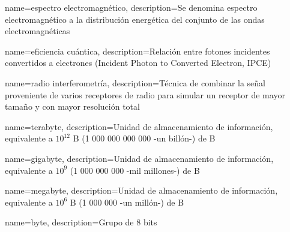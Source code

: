 
{
name={espectro electromagnético},
description={Se denomina espectro electromagnético a la distribución energética del conjunto de las ondas electromagnéticas}
}

{
name={eficiencia cuántica},
description={Relación entre fotones incidentes convertidos a electrones (Incident Photon to Converted Electron, IPCE)}
}

{
name={radio interferometría},
description={Técnica de combinar la señal proveniente de varios receptores de radio para simular un receptor de mayor tamaño y con mayor resolución total}
}

{
name={terabyte},
description={Unidad de almacenamiento de información, equivalente a $10^{12}$ \gls{B} (1 000 000 000 000 -un billón-) de \gls{B}}
}

{
name={gigabyte},
description={Unidad de almacenamiento de información, equivalente a $10^9$ (1 000 000 000 -mil millones-) de \gls{B}}
}

{
name={megabyte},
description={Unidad de almacenamiento de información, equivalente a $10^6$ \gls{B} (1 000 000 -un millón-) de \gls{B}}
}

{
name={byte},
description={Grupo de 8 bits}
}

